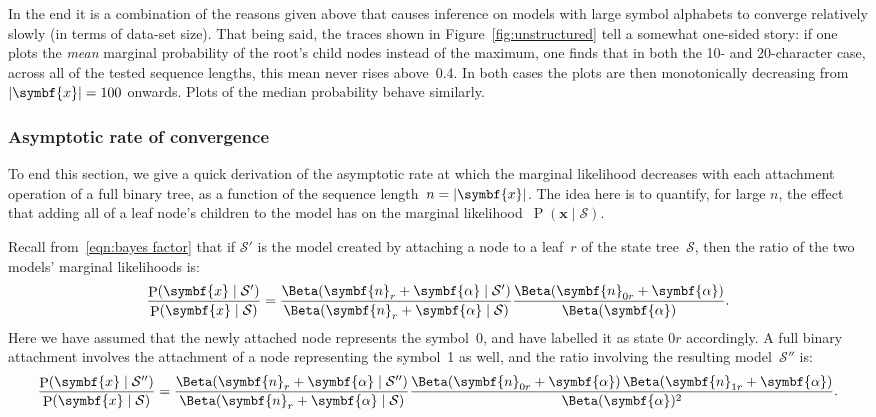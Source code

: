 \documentclass[11pt,a4paper]{article}
\newcommand\mc[1]{\mathcal{#1}}               %
\newcommand\ub[1]{\symbf{#1}}                 %
\DeclareMathOperator\Pb{P}                    %
\DeclarePairedDelimiter\lr{\lparen}{\rparen}  %
\DeclarePairedDelimiter\abs{\lvert}{\rvert}   %
\begin{document}
In the end it is a combination of the reasons given above that causes inference
on models with large symbol alphabets to converge relatively slowly (in terms of
data-set size). That being said, the traces shown in
Figure~\ref{fig:unstructured} tell a somewhat one-sided story: if one plots the
\emph{mean} marginal probability of the root's child nodes instead of the
maximum, one finds that in both the 10- and 20-character case, across all of the
tested sequence lengths, this mean never rises above~0.4. In both cases the
plots are then monotonically decreasing from~\(\abs{\ub{x}} = 100\) onwards.
Plots of the median probability behave similarly.

\subsubsection{Asymptotic rate of convergence}\label{sec:asymptotic} %

To end this section, we give a quick derivation of the asymptotic rate at which
the marginal likelihood decreases with each attachment operation of a full
binary tree, as a function of the sequence length~\(n = \abs{\ub{x}}\). The idea
here is to quantify, for large \(n\), the effect that adding all of a leaf
node's children to the model has on the marginal likelihood~\(\Pb(\ub{x} \mid
\mc{S})\).

Recall from~\eqref{eqn:bayes factor} that if \(\mc{S}'\) is the model created by
attaching a node to a leaf~\(r\) of the state tree~\(\mc{S}\), then the ratio of
the two models' marginal likelihoods is:
\begin{equation}
  \frac{\Pb\lr{\ub{x} \mid \mc{S}'}}{\Pb\lr{\ub{x} \mid \mc{S}}} =
    \frac{\Beta\lr{\ub{n}_r + \ub{\alpha} \mid \mc{S}'}}
    {\Beta\lr{\ub{n}_r + \ub{\alpha} \mid \mc{S}}}
    \frac{\Beta\lr{\ub{n}_{0r} + \ub{\alpha}}}{\Beta\lr{\ub{\alpha}}}.
\end{equation}
Here we have assumed that the newly attached node represents the symbol~0, and
have labelled it as state \(0r\) accordingly. A full binary attachment involves
the attachment of a node representing the symbol~1 as well, and the ratio
involving the resulting model~\(\mc{S}''\) is:
\begin{equation}\label{eqn:bayes factor binary}
  \frac{\Pb\lr{\ub{x} \mid \mc{S}''}}{\Pb\lr{\ub{x} \mid \mc{S}}} =
    \frac{\Beta\lr{\ub{n}_r + \ub{\alpha} \mid \mc{S}''}}
    {\Beta\lr{\ub{n}_r + \ub{\alpha} \mid \mc{S}}}
    \frac{\Beta\lr{\ub{n}_{0r} + \ub{\alpha}}\,
    \Beta\lr{\ub{n}_{1r} + \ub{\alpha}}}{\Beta\lr{\ub{\alpha}}^2}.
\end{equation}
\end{document}
